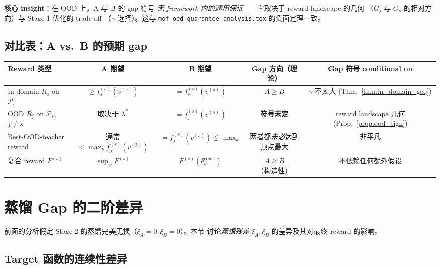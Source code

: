 \documentclass[11pt,a4paper]{article}
\newcommand{\const}{\mathrm{const}}
\theoremstyle{definition}
\begin{document}
\textbf{核心 insight}：在 OOD 上，A 与 B 的 gap 符号
\emph{无 framework 内的通用保证}——它取决于 reward landscape 的几何
（$G_j$ 与 $G_s$ 的相对方向）与 Stage 1 优化的 trade-off
（$\gamma$ 选择）。这与
\texttt{mof\_ood\_guarantee\_analysis.tex} 的负面定理一致。

\subsection{对比表：A vs.\ B 的预期 gap}

\begin{center}
\renewcommand{\arraystretch}{1.5}
\footnotesize
\begin{tabular}{@{}p{3.2cm}cccc@{}}
\toprule
\textbf{Reward 类型} & \textbf{A 期望} & \textbf{B 期望} & \textbf{Gap 方向（理论）} & \textbf{Gap 符号 conditional on}\\
\midrule
In-domain $R_s$ on $\mathcal{P}_s$ &
$\geq f_s^{(s)}(v^{(s)})$ &
$= f_s^{(s)}(v^{(s)})$ &
$A \geq B$ &
$\gamma$ 不太大 (Thm.~\ref{thm:in_domain_geq}) \\
\midrule
OOD $R_j$ on $\mathcal{P}_s$, $j \neq s$ &
取决于 $\lambda^*$ &
$= f_j^{(s)}(v^{(s)})$ &
\textbf{符号未定} &
reward landscape 几何 (Prop.~\ref{prop:ood_sign}) \\
\midrule
Best-OOD-teacher reward &
通常 $< \max_k f_j^{(s)}(v^{(k)})$ &
$= f_j^{(s)}(v^{(s)}) \leq \max_k$ &
两者都\emph{未必}达到顶点最大 &
非平凡 \\
\midrule
复合 reward $F^{(s)}$ &
$\sup_\psi F^{(s)}$ &
$F^{(s)}(\delta_s^{\const})$ &
$A \geq B$（构造性）&
不依赖任何额外假设 \\
\bottomrule
\end{tabular}
\end{center}

\section{蒸馏 Gap 的二阶差异}
\label{sec:distill_diff}

前面的分析假定 Stage 2 的蒸馏完美无损（$\xi_A = 0, \xi_B = 0$）。本节
讨论\emph{蒸馏残差} $\xi_A, \xi_B$ 的差异及其对最终 reward 的影响。

\subsection{Target 函数的连续性差异}
\end{document}
